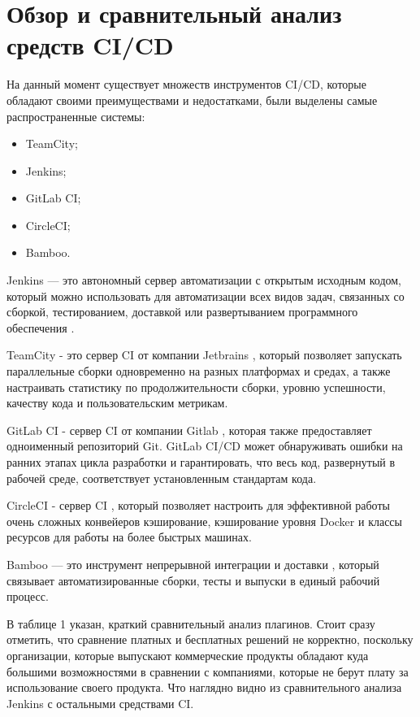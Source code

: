 \section{Обзор и сравнительный анализ средств CI/CD} \label{ch1:sec3}



На данный момент существует множеств инструментов CI/CD, которые обладают своими преимуществами и недостатками, были выделены самые распространенные системы:

\begin{itemize}
	\item TeamCity;
	\item Jenkins;
	\item GitLab CI;
	\item CircleCI;
	\item Bamboo.
\end{itemize}




Jenkins — это автономный сервер автоматизации с открытым исходным кодом, который можно использовать для автоматизации всех видов задач, связанных со сборкой, тестированием, доставкой или развертыванием программного обеспечения \cite{jenkins}.

TeamCity - это сервер CI от компании Jetbrains  \cite{tc}, который позволяет запускать параллельные сборки одновременно на разных платформах и средах, а также настраивать статистику по продолжительности сборки, уровню успешности, качеству кода и пользовательским метрикам.

GitLab CI - сервер CI от компании Gitlab \cite{gitlab}, которая также предоставляет одноименный репозиторий Git. GitLab CI/CD может обнаруживать ошибки на ранних этапах цикла разработки и гарантировать, что весь код, развернутый в рабочей среде, соответствует установленным стандартам кода.

CircleCI - сервер CI \cite{circle}, который позволяет настроить для эффективной работы очень сложных конвейеров кэширование, кэширование уровня Docker и классы ресурсов для работы на более быстрых машинах.

Bamboo — это инструмент непрерывной интеграции и доставки  \cite{bamboo}, который связывает автоматизированные сборки, тесты и выпуски в единый рабочий процесс.

В таблице 1 указан, краткий сравнительный анализ плагинов. Стоит сразу отметить, что сравнение платных и бесплатных решений не корректно, поскольку организации, которые выпускают коммерческие продукты обладают куда большими возможностями в сравнении с компаниями, которые не берут плату за использование своего продукта. Что наглядно видно из сравнительного анализа Jenkins с остальными средствами CI.

